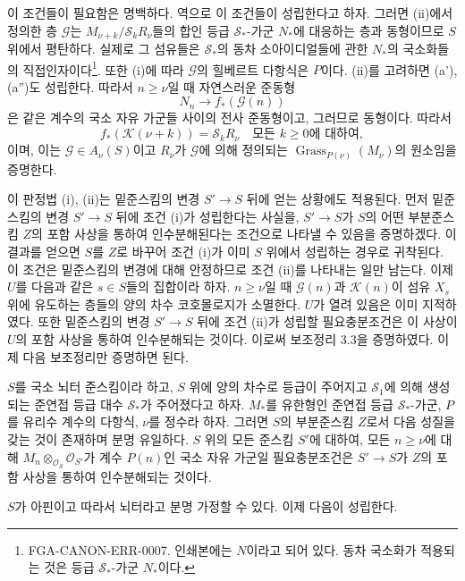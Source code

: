 이 조건들이 필요함은 명백하다. 역으로 이 조건들이 성립한다고 하자.
그러면 (ii)에서 정의한 층 $\mathcal G$는
$M_{\nu+k}/\mathcal S_kR_\nu$들의 합인 등급 $\mathcal S_*$-가군
$N_*$에 대응하는 층과 동형이므로 $S$ 위에서 평탄하다. 실제로 그
섬유들은 $\mathcal S_*$의 동차 소아이디얼들에 관한 $N_*$의 국소화들의
직접인자이다\footnote{FGA-CANON-ERR-0007. 인쇄본에는 $N$이라고 되어
있다. 동차 국소화가 적용되는 것은 등급 $\mathcal S_*$-가군 $N_*$이다.}.
또한 (i)에 따라 $\mathcal G$의 힐베르트 다항식은 $P$이다. (ii)를
고려하면 (a'), (a'')도 성립한다. 따라서 $n\geq\nu$일 때 자연스러운
준동형
\[
N_n\longrightarrow f_*(\mathcal G(n))
\]
은 같은 계수의 국소 자유 가군들 사이의 전사 준동형이고, 그러므로
동형이다. 따라서
\[
f_*(\mathcal K(\nu+k))=\mathcal S_kR_\nu
\quad\text{모든 $k\geq0$에 대하여},
\]
이며, 이는 $\mathcal G\in A_\nu(S)$이고 $R_\nu$가 $\mathcal G$에 의해
정의되는 $\operatorname{Grass}_{P(\nu)}(M_\nu)$의 원소임을 증명한다.

이 판정법 (i), (ii)는 밑준스킴의 변경 $S'\longrightarrow S$ 뒤에 얻는
상황에도 적용된다. 먼저 밑준스킴의 변경 $S'\longrightarrow S$ 뒤에
조건 (i)가 성립한다는 사실을, $S'\longrightarrow S$가 $S$의 어떤
부분준스킴 $Z$의 포함 사상을 통하여 인수분해된다는 조건으로 나타낼 수
있음을 증명하겠다. 이 결과를 얻으면 $S$를 $Z$로 바꾸어 조건 (i)가 이미
$S$ 위에서 성립하는 경우로 귀착된다. 이 조건은 밑준스킴의 변경에 대해
안정하므로 조건 (ii)를 나타내는 일만 남는다. 이제 $U$를 다음과 같은
$s\in S$들의 집합이라 하자. $n\geq\nu$일 때 $\mathcal G(n)$과
$\mathcal K(n)$이 섬유 $X_s$ 위에 유도하는 층들의 양의 차수 코호몰로지가
소멸한다. $U$가 열려 있음은 이미 지적하였다. 또한 밑준스킴의 변경
$S'\longrightarrow S$ 뒤에 조건 (ii)가 성립할 필요충분조건은 이 사상이
$U$의 포함 사상을 통하여 인수분해되는 것이다. 이로써 보조정리 3.3을
증명하였다. 이제 다음 보조정리만 증명하면 된다.

 $S$를 국소 뇌터 준스킴이라 하고, $S$ 위에 양의
차수로 등급이 주어지고 $\mathcal S_1$에 의해 생성되는 준연접 등급 대수
$\mathcal S_*$가 주어졌다고 하자. $M_*$를 유한형인 준연접 등급
$\mathcal S_*$-가군, $P$를 유리수 계수의 다항식, $\nu$를 정수라 하자.
그러면 $S$의 부분준스킴 $Z$로서 다음 성질을 갖는 것이 존재하며 분명
유일하다.
$S$ 위의 모든 준스킴 $S'$에 대하여, 모든 $n\geq\nu$에 대해
$M_n\otimes_{\mathcal O_S}\mathcal O_{S'}$가 계수 $P(n)$인 국소 자유
가군일 필요충분조건은 $S'\longrightarrow S$가 $Z$의 포함 사상을 통하여
인수분해되는 것이다.

$S$가 아핀이고 따라서 뇌터라고 분명 가정할 수 있다. 이제 다음이
성립한다.

